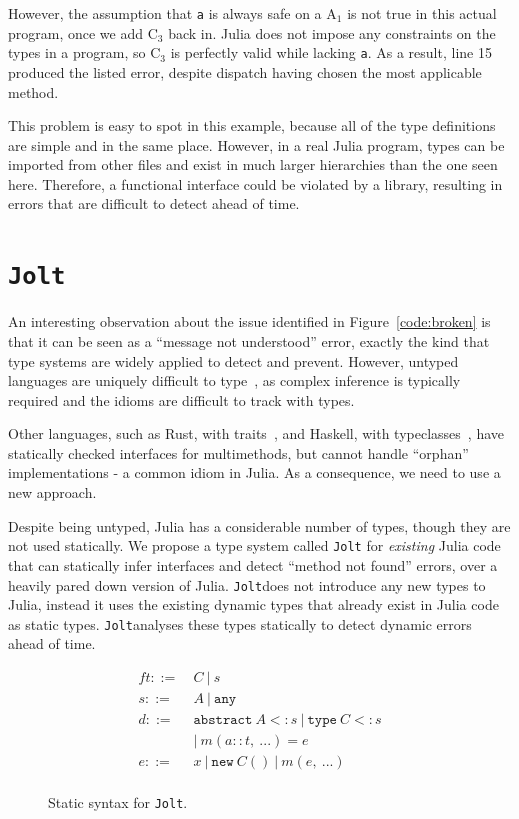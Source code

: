 \documentclass[preprint]{sigplanconf}
\newcommand{\xt}[1]{\texttt{#1}}
\newcommand{\abstype}[2]{\xt{abstract}~#1 <: #2}
\newcommand{\oftype}[2]{#1::#2}
\newcommand{\m}[2]{{#1}(#2)}
\newcommand{\contype}[2]{\xt{type}~#1 <: #2}
\newcommand{\any}{\xt{any}}
\newcommand{\jolt}{\xt{Jolt}}
\renewcommand{\ldots}{...}
\newcommand{\cnum}[2]{$\text{#1}_#2$}
\begin{document}
However, the assumption that \xt{a} is always safe on a \cnum{A}{1} is not true
in this actual program, once we add \cnum{C}{3} back in. Julia does not impose
any constraints on the types in a program, so \cnum{C}{3} is perfectly valid
while lacking \xt{a}. As a result, line 15 produced the listed error, despite 
dispatch having chosen the most applicable method.

This problem is easy to spot in this example, because all of the type definitions
are simple and in the same place. However, in a real Julia program, types can be
imported from other files and exist in much larger hierarchies than the one seen
here. Therefore, a functional interface could be violated by a library, resulting in
errors that are difficult to detect ahead of time.

\section{\jolt}
An interesting observation about the issue identified in Figure~\ref{code:broken}
is that it can be seen as a ``message not understood'' error, exactly the kind
that type systems are widely applied to detect and prevent. However, untyped 
languages are uniquely difficult to type~\cite{cannonpython}, as complex inference is typically
required and the idioms are difficult to track with types.

Other languages, such as Rust, with traits~\cite{rust}, and Haskell, with 
typeclasses~\cite{typeclasses}, have statically checked interfaces for multimethods, but 
cannot handle ``orphan'' implementations - a common idiom in Julia. As a 
consequence, we need to use a new approach.

Despite being untyped, Julia has a considerable
number of types, though they are not used statically. We propose a type system called \jolt\space
for \emph{existing} Julia code that can statically infer interfaces and detect
``method not found'' errors, over a heavily pared down version of Julia.
\jolt\space does not introduce any new types to Julia, instead it uses the existing dynamic
types that already exist in Julia code as static types.
\jolt\space analyses these types statically to detect dynamic errors ahead of time.

\begin{figure}
\begin{align*}f
t ::=~&  C ~|~ s\\
s ::=~& A ~|~ \any\\
d ::=~& \abstype{A}{s} ~|~ \contype{C}{s} \\
  & |~ \m{m}{\oftype{a}{t}, ~\ldots} = e\\
e ::=~& x ~|~ \xt{new} ~ C() ~|~ m(e,~\ldots) \\
\end{align*}
\caption{Static syntax for \jolt.}
\label{fm:syntax}
\end{figure}
\end{document}
